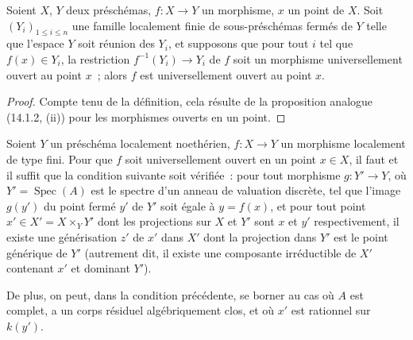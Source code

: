 \begin{proposition}[14.3.5]
\label{IV.14.3.5-fr}
Soient $X$, $Y$ deux préschémas, $f:X\to Y$ un morphisme, $x$ un point de $X$.
Soit $(Y_i)_{1\leq i\leq n}$ une famille localement finie de sous-préschémas
fermés de $Y$ telle que l'espace $Y$ soit réunion des $Y_i$, et supposons que pour
tout $i$ tel que $f(x)\in Y_i$, la restriction $f^{-1}(Y_i)\to Y_i$ de $f$ soit un
morphisme universellement ouvert au point $x$~; alors $f$ est universellement
ouvert au point $x$.
\end{proposition}

\begin{proof}
Compte tenu de la définition, cela résulte de la proposition analogue (14.1.2,
(ii)) pour les morphismes ouverts en un point.
\end{proof}

\begin{proposition}[14.3.6]
\label{IV.14.3.6-fr}
Soient $Y$ un préschéma localement noethérien, $f:X\to Y$ un morphisme localement
de type fini. Pour que $f$ soit universellement ouvert en un point $x\in X$, il
faut et il suffit que la condition suivante soit vérifiée~: pour tout morphisme
$g:Y'\to Y$, où $Y'=\operatorname{Spec}(A)$ est le spectre d'un anneau de
valuation discrète, tel que l'image $g(y')$ du point fermé $y'$ de $Y'$ soit égale
à $y=f(x)$, et pour tout point $x'\in X'=X\times_Y Y'$ dont les projections sur
$X$ et $Y'$ sont $x$ et $y'$ respectivement, il existe une générisation $z'$ de
$x'$ dans $X'$ dont la projection dans $Y'$ est le point générique de $Y'$
(autrement dit, il existe une composante irréductible de $X'$ contenant $x'$ et
dominant $Y'$).


De plus, on peut, dans la condition précédente, se borner au cas où $A$ est
complet, a un corps résiduel algébriquement clos, et où $x'$ est rationnel sur
$k(y')$.
\end{proposition}

